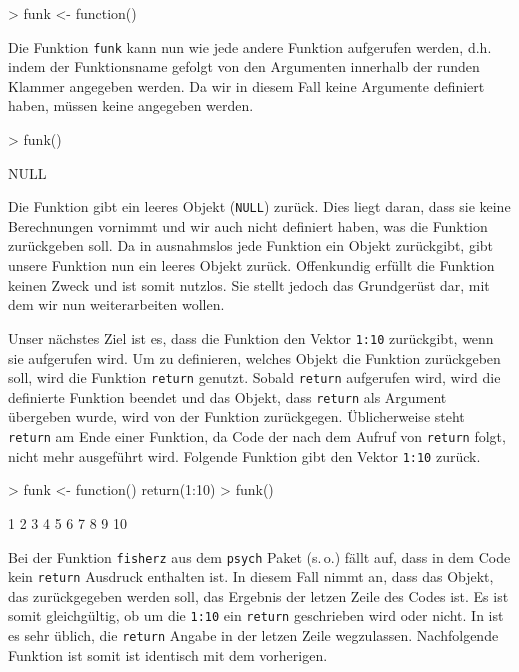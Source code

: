 \documentclass[12pt, a4paper,twoside,openany,x11names,svgnames]{memoir}
\begin{document}
\begin{Schunk}
\begin{Sinput}
> funk <- function(){}
\end{Sinput}
\end{Schunk}

Die Funktion \texttt{funk} kann nun wie jede andere Funktion aufgerufen werden, d.h. indem der Funktionsname gefolgt von den Argumenten innerhalb der runden Klammer angegeben werden. Da wir in diesem Fall keine Argumente definiert haben, müssen keine angegeben werden.

\begin{Schunk}
\begin{Sinput}
> funk()
\end{Sinput}
\begin{Soutput}
NULL
\end{Soutput}
\end{Schunk}

Die Funktion gibt ein leeres Objekt (\texttt{NULL}) zurück. Dies liegt daran, dass sie keine Berechnungen vornimmt und wir auch nicht definiert haben, was die Funktion zurückgeben soll. Da in \R{} ausnahmslos jede Funktion ein Objekt zurückgibt, gibt unsere Funktion nun ein leeres Objekt zurück. Offenkundig erfüllt die Funktion keinen Zweck und ist somit nutzlos. Sie stellt jedoch das Grundgerüst dar, mit dem wir nun weiterarbeiten wollen. 

Unser nächstes Ziel ist es, dass die Funktion den Vektor \texttt{1:10} zurückgibt, wenn sie aufgerufen wird. Um zu definieren, welches Objekt die Funktion zurückgeben soll, wird die Funktion \texttt{return} genutzt. Sobald \texttt{return} aufgerufen wird, wird die definierte Funktion beendet und das Objekt, dass \texttt{return} als Argument übergeben wurde, wird von der Funktion zurückgegen. Üblicherweise steht \texttt{return} am Ende einer Funktion, da Code der nach dem Aufruf von \texttt{return} folgt, nicht mehr ausgeführt wird. Folgende Funktion gibt den Vektor \texttt{1:10} zurück.

\begin{Schunk}
\begin{Sinput}
> funk <- function(){
   return(1:10)
 }
> funk()
\end{Sinput}
\begin{Soutput}
 [1]  1  2  3  4  5  6  7  8  9 10
\end{Soutput}
\end{Schunk}

Bei der Funktion \texttt{fisherz} aus dem \texttt{psych} Paket (s.\,o.) fällt auf, dass in dem Code kein \texttt{return} Ausdruck enthalten ist. In diesem Fall nimmt \R{} an, dass das Objekt, das zurückgegeben werden soll, das Ergebnis der letzen Zeile des Codes ist. Es ist somit gleichgültig, ob um die \texttt{1:10} ein \texttt{return} geschrieben wird oder nicht. In \R{} ist es sehr üblich, die \texttt{return} Angabe in der letzen Zeile wegzulassen. Nachfolgende Funktion ist somit ist identisch mit dem vorherigen.
\end{document}
